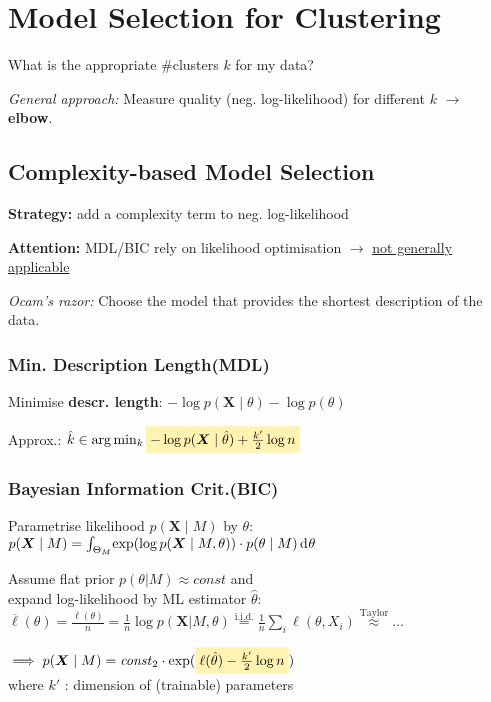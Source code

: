 \section{Model Selection for Clustering}

What is the appropriate \#clusters $k$ for my data?

\emph{General approach:} Measure quality (neg. log-likelihood) for different $k$ \enspace $\to$ \textbf{elbow}.

\subsection{Complexity-based Model Selection}

\textbf{Strategy:} add a complexity term to neg. log-likelihood

\textbf{Attention:} MDL/BIC rely on likelihood optimisation $\to$ \underline{not generally applicable}


\emph{Ocam's razor:}\enspace
Choose the model that provides the shortest description of the data.

\subsubsection{Min. Description Length\quad (MDL)}

Minimise \textbf{descr. length}:\enspace
$-\log p(\bm X\mid \theta) - \log p(\theta)$

Approx.:\enspace
$\hat k \in \arg\min_k \highlight{-\log p(\bm X\mid \hat\theta) + \frac{k'}{2} \log n}$

\subsubsection{Bayesian Information Crit.\quad (BIC)}

Parametrise likelihood $p(\bm X\mid M)$ by $\theta$:\\
\enspace $p(\bm X\mid M) = \int_{\Theta_M} \! \exp(\log p(\bm X\mid M, \theta)) \cdot p(\theta\mid M) \diff\theta$

Assume flat prior $p(\theta\vert M) \approx \mathit{const}$ and\\
expand log-likelihood by ML estimator $\hat\theta$:\\
$\overline\ell (\theta) = \frac{\ell(\theta)}{n} = \frac1n \log p(\bm X\vert M,\theta) \overset{\text{i.i.d.}}{=} \frac1n \sum_i \ell(\theta, X_i) \overset{\textrm{Taylor}}{\approx} \ldots$

$\implies p(\bm X\mid M) = \mathit{const}_2 \cdot \exp( \highlight{\ell (\hat\theta) - \frac{k'}{2} \log n} )$\\
\quad where $k'$ : dimension of (trainable) parameters

